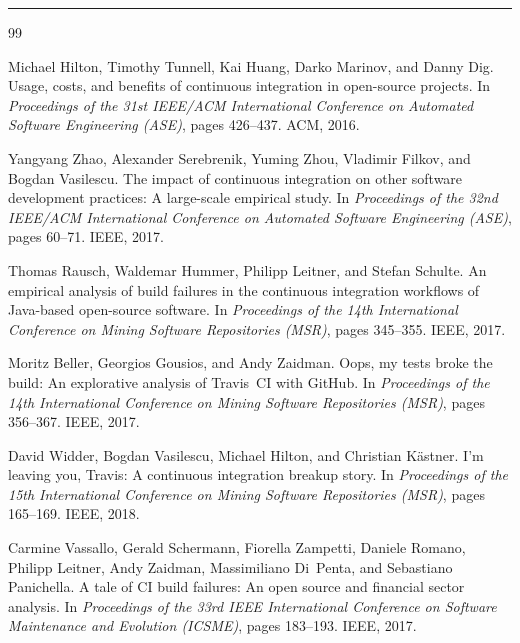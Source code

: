 \documentclass[a4paper,11pt]{article}
\begin{document}
\bigskip
\hrule
\bigskip

\begin{thebibliography}{99}

Michael Hilton, Timothy Tunnell, Kai Huang, Darko Marinov, and Danny Dig.
\newblock Usage, costs, and benefits of continuous integration in open-source projects.
\newblock In \emph{Proceedings of the 31st IEEE/ACM International Conference on Automated Software Engineering (ASE)}, pages 426--437. ACM, 2016.

Yangyang Zhao, Alexander Serebrenik, Yuming Zhou, Vladimir Filkov, and Bogdan Vasilescu.
\newblock The impact of continuous integration on other software development practices: A large-scale empirical study.
\newblock In \emph{Proceedings of the 32nd IEEE/ACM International Conference on Automated Software Engineering (ASE)}, pages 60--71. IEEE, 2017.

Thomas Rausch, Waldemar Hummer, Philipp Leitner, and Stefan Schulte.
\newblock An empirical analysis of build failures in the continuous integration workflows of Java-based open-source software.
\newblock In \emph{Proceedings of the 14th International Conference on Mining Software Repositories (MSR)}, pages 345--355. IEEE, 2017.

Moritz Beller, Georgios Gousios, and Andy Zaidman.
\newblock Oops, my tests broke the build: An explorative analysis of Travis~CI with GitHub.
\newblock In \emph{Proceedings of the 14th International Conference on Mining Software Repositories (MSR)}, pages 356--367. IEEE, 2017.

David Widder, Bogdan Vasilescu, Michael Hilton, and Christian K\"{a}stner.
\newblock I'm leaving you, Travis: A continuous integration breakup story.
\newblock In \emph{Proceedings of the 15th International Conference on Mining Software Repositories (MSR)}, pages 165--169. IEEE, 2018.

Carmine Vassallo, Gerald Schermann, Fiorella Zampetti, Daniele Romano, Philipp Leitner, Andy Zaidman, Massimiliano Di~Penta, and Sebastiano Panichella.
\newblock A tale of CI build failures: An open source and financial sector analysis.
\newblock In \emph{Proceedings of the 33rd IEEE International Conference on Software Maintenance and Evolution (ICSME)}, pages 183--193. IEEE, 2017.


\end{thebibliography}
\end{document}
